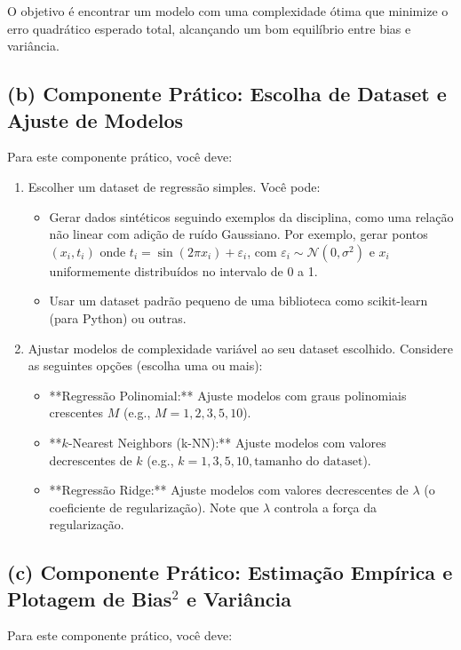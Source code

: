 \documentclass{article}
\begin{document}
O objetivo é encontrar um modelo com uma complexidade ótima que minimize o erro quadrático esperado total, alcançando um bom equilíbrio entre bias e variância.

\subsection*{(b) Componente Prático: Escolha de Dataset e Ajuste de Modelos}

Para este componente prático, você deve:

\begin{enumerate}
    \item Escolher um dataset de regressão simples. Você pode:
    \begin{itemize}
        \item Gerar dados sintéticos seguindo exemplos da disciplina, como uma relação não linear com adição de ruído Gaussiano. Por exemplo, gerar pontos $(x_i, t_i)$ onde $t_i = \sin(2\pi x_i) + \varepsilon_i$, com $\varepsilon_i \sim \mathcal{N}(0, \sigma^2)$ e $x_i$ uniformemente distribuídos no intervalo de 0 a 1.
        \item Usar um dataset padrão pequeno de uma biblioteca como scikit-learn (para Python) ou outras.
    \end{itemize}
    \item Ajustar modelos de complexidade variável ao seu dataset escolhido. Considere as seguintes opções (escolha uma ou mais):
    \begin{itemize}
        \item **Regressão Polinomial:** Ajuste modelos com graus polinomiais crescentes $M$ (e.g., $M=1, 2, 3, 5, 10$).
        \item **$k$-Nearest Neighbors (k-NN):** Ajuste modelos com valores decrescentes de $k$ (e.g., $k=1, 3, 5, 10, \text{tamanho do dataset}$).
        \item **Regressão Ridge:** Ajuste modelos com valores decrescentes de $\lambda$ (o coeficiente de regularização). Note que $\lambda$ controla a força da regularização.
    \end{itemize}
\end{enumerate}

\subsection*{(c) Componente Prático: Estimação Empírica e Plotagem de Bias$^2$ e Variância}

Para este componente prático, você deve:
\end{document}
